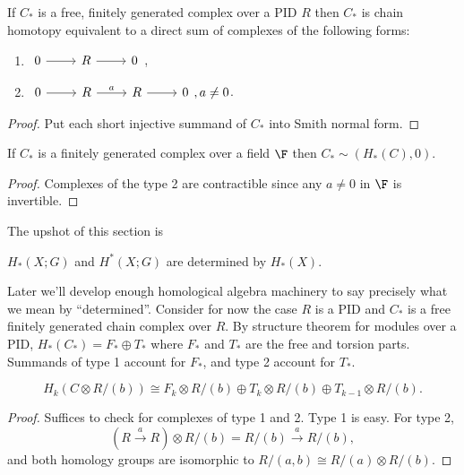 \documentclass[a4paper]{article}
\begin{document}
\begin{corollary}
  If \(C_*\) is a free, finitely generated complex over a PID \(R\) then \(C_*\) is chain homotopy equivalent to a direct sum of complexes of the following forms:
  \begin{enumerate}
  \item \(
    \begin{tikzcd}
      0 \ar[r] & R \ar[r] & 0
    \end{tikzcd}
    \),
  \item \(
    \begin{tikzcd}
      0 \ar[r] & R \ar[r, "a"] & R \ar[r] & 0
    \end{tikzcd}
    , a \neq 0\).
  \end{enumerate}
\end{corollary}

\begin{proof}
  Put each short injective summand of \(C_*\) into Smith normal form.
\end{proof}

\begin{corollary}
  If \(C_*\) is a finitely generated complex over a field \(\F\) then \(C_* \sim (H_*(C), 0)\).
\end{corollary}

\begin{proof}
  Complexes of the type 2 are contractible since any \(a \neq 0\) in \(\F\) is invertible.
\end{proof}

The upshot of this section is

\begin{theorem}
  \(H_*(X; G)\) and \(H^*(X; G)\) are determined by \(H_*(X)\).
\end{theorem}

Later we'll develop enough homological algebra machinery to say precisely what we mean by ``determined''. Consider for now the case \(R\) is a PID and \(C_*\) is a free finitely generated chain complex over \(R\). By structure theorem for modules over a PID, \(H_*(C_*) = F_* \oplus T_*\) where \(F_*\) and \(T_*\) are the free and torsion parts. Summands of type 1 account for \(F_*\), and type 2 account for \(T_*\).

\begin{proposition}
  \[
    H_k(C \otimes R/(b)) \cong F_k \otimes R/(b) \oplus T_k \otimes R/(b) \oplus T_{k - 1} \otimes R/(b).
  \]
\end{proposition}

\begin{proof}
  Suffices to check for complexes of type 1 and 2. Type 1 is easy. For type 2,
  \[
    (R \xrightarrow{a} R) \otimes R/(b) = R/(b) \xrightarrow{a} R/(b),
  \]
  and both homology groups are isomorphic to \(R/(a, b) \cong R/(a) \otimes R/(b)\).
\end{proof}
\end{document}
